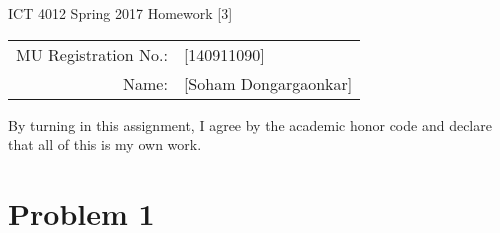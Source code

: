 \documentclass[12pt]{article}
\begin{document}
\begin{center}
{\Large ICT 4012 Spring 2017 Homework [3]} %

\begin{tabular}{rl}
MU Registration No.: & [140911090] \\  %
Name: & [Soham Dongargaonkar] \\   %
\end{tabular}
\end{center}

By turning in this assignment, I agree by the academic honor code and declare that all of this is my own work.

\section*{Problem 1}
\end{document}
